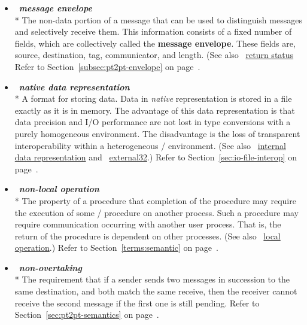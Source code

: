 \begin{itemize}
\label{glossary:message_envelope}
\item  ~\hypertarget{glossary:message_envelope}{\emph{\textbf{message envelope}}} \\*
The non-data portion of a message that can be used to
distinguish messages and selectively receive them.  This information consists
of a fixed number of fields, which are collectively called
the {\bf message envelope}.   These fields are, source, 
destination, tag, communicator, and length.
(See also ~\hyperlink{glossary:return_status}{return status} 
Refer to Section~\ref{subsec:pt2pt-envelope} on page~\pageref{subsec:pt2pt-envelope}.

\label{glossary:native_data_representation}
\item  ~\hypertarget{glossary:native_data_representation}{\emph{\textbf{native data representation}}} \\*
A format for storing data.
Data in \emph{native} representation is stored in a file exactly
as it is in memory.
The advantage of this data representation is that
data precision and I/O performance are not lost in type conversions
with a purely homogeneous environment.
The disadvantage is the loss of transparent interoperability within a
heterogeneous \MPI/ environment.
(See also ~\hyperlink{glossary:internal_data_representation}{internal data representation} and ~\hyperlink{glossary:external32}{external32}.)
Refer to Section~\ref{sec:io-file-interop} on page~\pageref{sec:io-file-interop}.

\label{glossary:non-local_operation}
\item  ~\hypertarget{glossary:non-local_operation}{\emph{\textbf{non-local operation}}} \\*
The property of a procedure that completion of the procedure may require
the execution of some \MPI/ procedure on another process.  Such a
procedure may require
communication occurring with another user process.
That is, the return of the procedure is dependent on other processes.
(See also ~\hyperlink{glossary:local_operation}{local operation}.)
Refer to Section~\ref{terms:semantic} on page~\pageref{terms:semantic}.

\label{glossary:non-overtaking}
\item  ~\hypertarget{glossary:non-overtaking}{\emph{\textbf{non-overtaking}}} \\*
The requirement that
if a sender sends two messages in succession to the same destination, and
both match the same receive, then the receiver cannot receive the
second message if the first one is still pending.
Refer to Section~\ref{sec:pt2pt-semantics} on page~\pageref{sec:pt2pt-semantics}.


\end{itemize}
